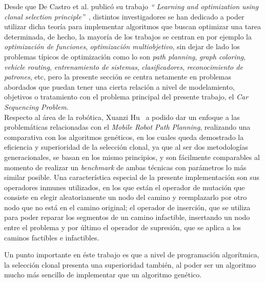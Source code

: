
Desde que De Castro et al. publicó su trabajo \emph{`` Learning and optimization using clonal selection principle''}~\cite{decastro},
distintos investigadores se han dedicado a poder utilizar dicha teoría para implementar algoritmos que buscan
optimizar una tarea determinada, de hecho, la mayoría de los trabajos se centran en por ejemplo la \emph{optimización
de funciones}, \emph{optimización multiobjetivo}, sin dejar de lado los problemas típicos de optimización como lo son
\emph{path planning}, \emph{graph coloring}, \emph{vehicle routing}, \emph{entrenamiento de sistemas}, \emph{clasificadores},
\emph{reconocimiento de patrones}, etc, pero la presente sección se centra netamente en problemas abordados que puedan
tener una cierta relación a nivel de modelamiento, objetivos o tratamiento con el problema principal del presente trabajo,
el \emph{Car Sequencing Problem}.\\



Respecto al área de la robótica, Xuanzi Hu~\cite{robotPlanning} a podido dar un enfoque a las problemáticas relacionadas
con el \emph{Mobile Robot Path Planning}, realizando una comparativa con los algoritmos genéticos, en los cuales queda demostrado
la eficiencia y superioridad de la selección clonal, ya que al ser dos metodologías generacionales, se basan en los mismo principios,
y son fácilmente comparables al momento de realizar un \emph{benchmark} de ambas técnicas con parámetros lo más similar posible.
Una característica especial de la presente implementación son sus operadores inmunes utilizados, en los que están el operador de mutación
que consiste en elegir aleatoriamente un nodo del camino y reemplazarlo por otro nodo que no está en el camino original; el operador
de inserción, que se utiliza para poder reparar los segmentos de un camino infactible, insertando un nodo entre el problema y por último
el operador de supresión, que se aplica a los caminos factibles e infactibles. 

Un punto importante en éste trabajo es que a nivel de programación algorítmica, la selección clonal presenta una superioridad también,
al poder ser un algoritmo mucho más sencillo de  implementar que un algoritmo genético.\\


